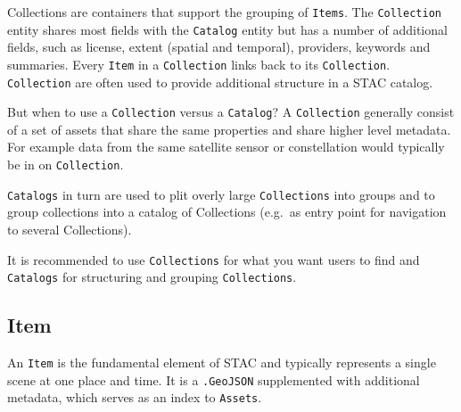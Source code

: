 \documentclass[
  letterpaper,
  DIV=11,
  numbers=noendperiod]{scrreprt}
\begin{document}
Collections are containers that support the grouping of \texttt{Items}.
The \texttt{Collection} entity shares most fields with the
\texttt{Catalog} entity but has a number of additional fields, such as
license, extent (spatial and temporal), providers, keywords and
summaries. Every \texttt{Item} in a \texttt{Collection} links back to
its \texttt{Collection}. \texttt{Collection} are often used to provide
additional structure in a STAC catalog.

\begin{tcolorbox}[enhanced jigsaw, coltitle=black, colback=white, leftrule=.75mm, colbacktitle=quarto-callout-note-color!10!white, titlerule=0mm, title=\textcolor{quarto-callout-note-color}{\faInfo}\hspace{0.5em}{Note}, rightrule=.15mm, bottomrule=.15mm, bottomtitle=1mm, toptitle=1mm, arc=.35mm, toprule=.15mm, left=2mm, opacityback=0, colframe=quarto-callout-note-color-frame, opacitybacktitle=0.6, breakable]

But when to use a \texttt{Collection} versus a \texttt{Catalog}? A
\texttt{Collection} generally consist of a set of assets that share the
same properties and share higher level metadata. For example data from
the same satellite sensor or constellation would typically be in on
\texttt{Collection}.

\texttt{Catalogs} in turn are used to plit overly large
\texttt{Collections} into groups and to group collections into a catalog
of Collections (e.g.~as entry point for navigation to several
Collections).

It is recommended to use \texttt{Collections} for what you want users to
find and \texttt{Catalogs} for structuring and grouping
\texttt{Collections}.

\end{tcolorbox}

\subsection{Item}\label{item}

An \texttt{Item} is the fundamental element of STAC and typically
represents a single scene at one place and time. It is a
\texttt{.GeoJSON} supplemented with additional metadata, which serves as
an index to \texttt{Assets}.
\end{document}
